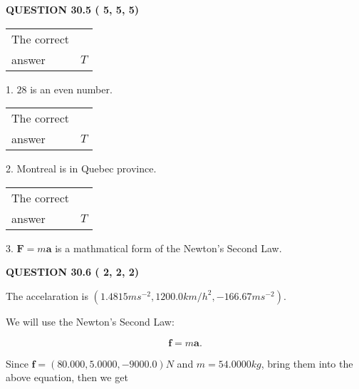 \documentclass[12pt]{article}
\begin{document}
 
 
  
\vspace{0.2in}
  
{\textbf{\Large{QUESTION
30.5 
 (          5,          5,          5)
}}}
  
  
 
 
\noindent{}

 
\noindent\begin{tabular}{|l|l|}\hline The correct & \\
          answer &  %
$T$ \\ \hline \end{tabular}
1. $ %
28$ is an  %
even number.
 
\noindent\begin{tabular}{|l|l|}\hline The correct & \\
          answer &  %
$T$ \\ \hline \end{tabular}
2.  %
Montreal is in  %
Quebec province.
 
\noindent\begin{tabular}{|l|l|}\hline The correct & \\
          answer &  %
$T$ \\ \hline \end{tabular}
3.  %
$\mathbf{F}=m\mathbf{a}$ is a mathmatical form of  %
the Newton's Second Law.
 
 
 
  
\vspace{0.2in}
  
{\textbf{\Large{QUESTION
30.6 
 (          2,          2,          2)
}}}
  
  
 
 
\noindent{}
 
 
The accelaration is
$(
1.4815ms^{-2},
1200.0km/h^2,
-166.67ms^{-2}
).
$
 
 
 
 
 
 
\noindent{}

We will use the Newton's Second Law:
 
\[
\mathbf{f}=m\mathbf{a}.
\]
 
Since $\mathbf{f}=( %
80.000,  %
5.0000,  %
-9000.0 )N$
and $m= %
54.0000kg$, bring them into the above equation, then we get
 
\end{document}
